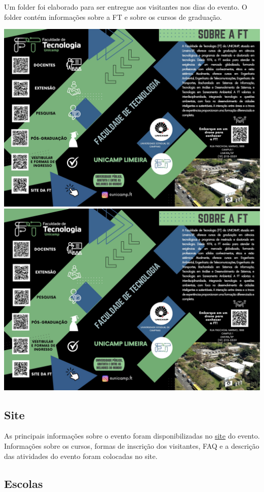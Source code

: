 \documentclass[
  letterpaper,
  DIV=11,
  numbers=noendperiod]{scrreprt}
\begin{document}
Um folder foi elaborado para ser entregue aos visitantes nos dias do
evento. O folder contém informações sobre a FT e sobre os cursos de
graduação.

\includegraphics[width=0.9\linewidth,height=\textheight,keepaspectratio]{planejamento/folder-1.jpg}
\includegraphics[width=0.9\linewidth,height=\textheight,keepaspectratio]{planejamento/folder-2.jpg}

\subsection{Site}\label{site}

As principais informações sobre o evento foram disponibilizadas no
\href{https://wordpress.ft.unicamp.br/ftpa/}{site} do evento.
Informações sobre os cursos, formas de inscrição dos visitantes, FAQ e a
descrição das atividades do evento foram colocadas no site.

\subsection{Escolas}\label{escolas}
\end{document}
